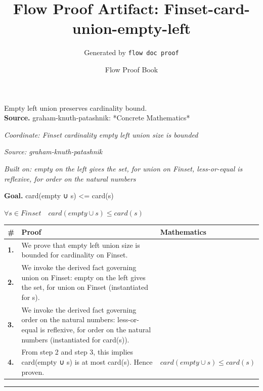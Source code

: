 \documentclass[11pt]{article}
\title{Flow Proof Artifact: Finset-card-union-empty-left}
\author{Generated by \texttt{flow doc proof}}
\date{Flow Proof Book}
\theoremstyle{definition}
\begin{document}
\maketitle
Empty left union preserves cardinality bound.\\[0.5em]
\textbf{Source.} graham-knuth-patashnik: *Concrete Mathematics*\\[0.5em]
\bigskip
{}\par
\smallskip\noindent\textit{Coordinate: Finset \cdot cardinality \cdot empty left union size is bounded}\par
\smallskip\noindent\textit{Source: graham-knuth-patashnik}\par
\smallskip\noindent\textit{Built on: empty on the left gives the set, for union on Finset, less-or-equal is reflexive, for order on the natural numbers}\par
\medskip
\noindent\textbf{Goal.} card(empty ∪ s) <= card(s)\par
\noindent$\displaystyle \forall s \in Finset\quad card(empty ∪ s) \le card(s)$\par
\medskip
\noindent
\begin{tabular}{@{} >{\raggedright\arraybackslash}p{} >{\raggedright\arraybackslash}p{} >{\raggedleft\arraybackslash}p{} @{}}
\textbf{\#} & \textbf{Proof} & \textbf{Mathematics} \\
\midrule
\textbf{1.} & We prove that empty left union size is bounded for cardinality on Finset. & \\[0.45em]
\textbf{2.} & We invoke the derived fact governing union on Finset: empty on the left gives the set, for union on Finset (instantiated for s). & \\[0.45em]
\textbf{3.} & We invoke the derived fact governing order on the natural numbers: less-or-equal is reflexive, for order on the natural numbers (instantiated for card(s)). & \\[0.45em]
\textbf{4.} & From step 2 and step 3, this implies card(empty ∪ s) is at most card(s). Hence proven. & $\displaystyle card(empty ∪ s) \le card(s)$ \\[0.45em]
\bottomrule
\end{tabular}
\label{thm:Finset-cardinality-empty_left_union_size_is_bounded}
\par\medskip\hrule
\end{document}
